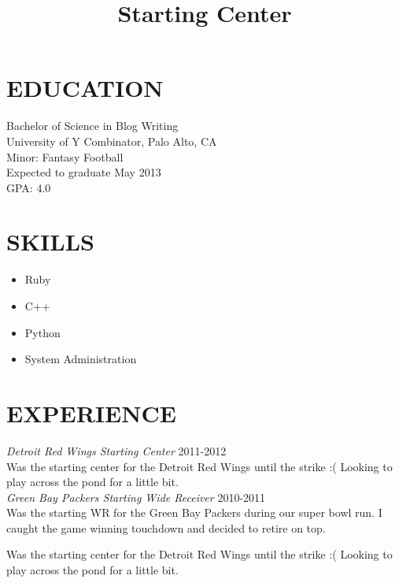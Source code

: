 \documentclass[line, margin]{res}
\begin{document}
\address{1234 Herp Derp Lane \\ Rabble, FL 34343 \\ (516) 516-5165}

\begin{resume}
\section{EDUCATION}
 Bachelor of Science in Blog Writing \\
 University of Y Combinator, Palo Alto, CA \\
 Minor: Fantasy Football \\
 Expected to graduate May 2013 \\
 GPA: 4.0

\section{SKILLS}
\begin{itemize}[leftmargin=10pt]
    \item Ruby
    \item C++
    \item Python
    \item System Administration
\end{itemize}

\section{EXPERIENCE}
    \textit{Detroit Red Wings Starting Center} \hfill 2011-2012 \\
    Was the starting center for the Detroit Red Wings until the strike :( Looking to play across the pond for a little bit. \\

    \textit{Green Bay Packers Starting Wide Receiver} \hfill 2010-2011 \\
    Was the starting WR for the Green Bay Packers during our super bowl run. I caught the game winning touchdown and decided to retire on top.

    \title{Starting Center}
    \begin{position} Was the starting center for the Detroit Red Wings until the strike :( Looking to play across the pond for a little bit. \end{position}

\end{resume}
\end{document}
